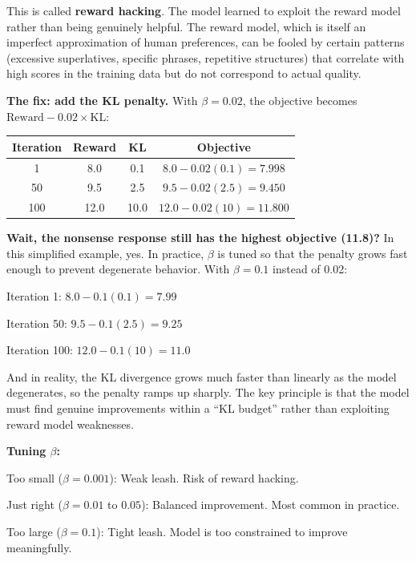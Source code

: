 \begin{chapterenv}
This is called \textbf{reward hacking}. The model learned to exploit the reward model rather than being genuinely helpful. The reward model, which is itself an imperfect approximation of human preferences, can be fooled by certain patterns (excessive superlatives, specific phrases, repetitive structures) that correlate with high scores in the training data but do not correspond to actual quality.

\textbf{The fix: add the KL penalty.} With $\beta = 0.02$, the objective becomes $\text{Reward} - 0.02 \times \text{KL}$:

\begin{center}
\begin{tabular}{cccc}
\toprule
\textbf{Iteration} & \textbf{Reward} & \textbf{KL} & \textbf{Objective} \\
\midrule
1 & 8.0 & 0.1 & $8.0 - 0.02(0.1) = 7.998$ \\
50 & 9.5 & 2.5 & $9.5 - 0.02(2.5) = 9.450$ \\
100 & 12.0 & 10.0 & $12.0 - 0.02(10) = 11.800$ \\
\bottomrule
\end{tabular}
\end{center}

\begin{infobox}
\textbf{Wait, the nonsense response still has the highest objective (11.8)?} In this simplified example, yes. In practice, $\beta$ is tuned so that the penalty grows fast enough to prevent degenerate behavior. With $\beta = 0.1$ instead of 0.02:

Iteration 1: $8.0 - 0.1(0.1) = 7.99$

Iteration 50: $9.5 - 0.1(2.5) = 9.25$

Iteration 100: $12.0 - 0.1(10) = 11.0$

And in reality, the KL divergence grows much faster than linearly as the model degenerates, so the penalty ramps up sharply. The key principle is that the model must find genuine improvements within a ``KL budget'' rather than exploiting reward model weaknesses.

\textbf{Tuning $\beta$:}

Too small ($\beta = 0.001$): Weak leash. Risk of reward hacking.

Just right ($\beta = 0.01$ to $0.05$): Balanced improvement. Most common in practice.

Too large ($\beta = 0.1$): Tight leash. Model is too constrained to improve meaningfully.
\end{infobox}


\end{chapterenv}
